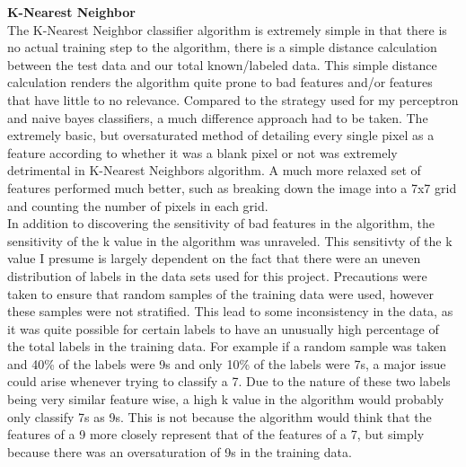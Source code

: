 \documentclass[12pt]{article}
\newcommand\tab[1][1cm]{\hspace*{#1}}
\begin{document}
\textbf{K-Nearest Neighbor} \\
\tab The K-Nearest Neighbor classifier algorithm is extremely simple in that there is no actual training step to the algorithm, there is a simple distance calculation between the test data and our total known/labeled data. This simple distance calculation renders the algorithm quite prone to bad features and/or features that have little to no relevance. Compared to the strategy used for my perceptron and naive bayes classifiers, a much difference approach had to be taken. The extremely basic, but oversaturated method of detailing every single pixel as a feature according to whether it was a blank pixel or not was extremely detrimental in K-Nearest Neighbors algorithm. A much more relaxed set of features performed much better, such as breaking down the image into a 7x7 grid and counting the number of pixels in each grid.\\
\tab In addition to discovering the sensitivity of bad features in the algorithm, the sensitivity of the k value in the algorithm was unraveled. This sensitivty of the k value I presume is largely dependent on the fact that there were an uneven distribution of labels in the data sets used for this project. Precautions were taken to ensure that random samples of the training data were used, however these samples were not stratified. This lead to some inconsistency in the data, as it was quite possible for certain labels to have an unusually high percentage of the total labels in the training data. For example if a random sample was taken and 40\% of the labels were 9s and only 10\% of the labels were 7s, a major issue could arise whenever trying to classify a 7. Due to the nature of these two labels being very similar feature wise, a high k value in the algorithm would probably only classify 7s as 9s. This is not because the algorithm would think that the features of a 9 more closely represent that of the features of a 7, but simply because there was an oversaturation of 9s in the training data.	\\













\newpage
\end{document}
